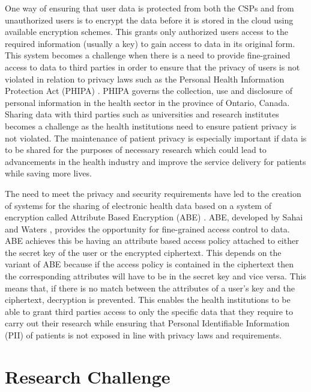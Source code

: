 One way of ensuring that user data is protected from both the CSPs and from unauthorized users is to encrypt the data before it is stored in the cloud using available encryption schemes. This grants only authorized users access to the required information (usually a key) to gain access to data in its original form. This system becomes a challenge when there is a need to provide fine-grained access to data to third parties in order to ensure that the privacy of users is not violated in relation to privacy laws such as the Personal Health Information Protection Act (PHIPA) \cite{pihipa}. PHIPA governs the collection, use and disclosure of personal information in the health sector in the province of Ontario, Canada. Sharing data with third parties such as universities and research institutes becomes a challenge as the health institutions need to ensure patient privacy is not violated. The maintenance of patient privacy is especially important if data is to be shared for the purposes of necessary research which could lead to advancements in the health industry and improve the service delivery for patients while saving more lives.

The need to meet the privacy and security requirements have led to the creation of systems for the sharing of electronic health data based on a system of encryption called Attribute Based Encryption (ABE) \cite{Ibraimi2010, Narayan2010, Akinyele2010, Barua2011, Alshehri, Hupperich2012, Hsieh2012, Li2013}. ABE, developed by Sahai and Waters \cite{Sahai2005}, provides the opportunity for fine-grained access control to data. ABE achieves this be having an attribute based access policy attached to either the secret key of the user or the encrypted ciphertext. This depends on the variant of ABE because if the access policy is contained in the ciphertext then the corresponding attributes will have to be in the secret key and vice versa. This means that, if there is no match between the attributes of a user's key and the ciphertext, decryption is prevented. This enables the health institutions to be able to grant third parties access to only the specific data that they require to carry out their research while ensuring that Personal Identifiable Information (PII) of patients is not exposed in line with privacy laws and requirements.

\section{Research Challenge}

